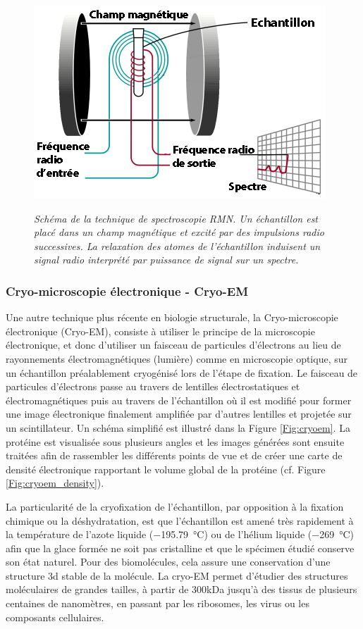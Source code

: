 \begin{figure}[h]
  \centering
  {\includegraphics[width=0.7\linewidth]{./figures/ch1/rmn.png}}
    \caption[Schéma de la technique de spectroscopie RMN.]{\it Schéma de la technique de spectroscopie RMN. Un échantillon est placé dans un champ magnétique et excité par des impulsions radio successives. La relaxation des atomes de l'échantillon induisent un signal radio interprété par puissance de signal sur un spectre.}
    \label{Fig:rmn}
  \hspace{0.2cm}
\end{figure}

\subsubsection{Cryo-microscopie électronique - Cryo-EM}


Une autre technique plus récente en biologie structurale, la Cryo-microscopie électronique (Cryo-EM), consiste à utiliser le principe de la microscopie électronique, et donc d'utiliser un faisceau de particules d'électrons au lieu de rayonnements électromagnétiques (lumière) comme en microscopie optique, sur un échantillon préalablement cryogénisé lors de l'étape de fixation. Le faisceau de particules d'électrons passe au travers de lentilles électrostatiques et électromagnétiques puis au travers de l'échantillon où il est modifié pour former une image électronique finalement amplifiée par d'autres lentilles et projetée sur un scintillateur. Un schéma simplifié est illustré dans la Figure \ref{Fig:cryoem}.
La protéine est visualisée sous plusieurs angles et les images générées sont ensuite traitées afin de rassembler les différents points de vue et de créer une carte de densité électronique rapportant le volume global de la protéine (cf. Figure \ref{Fig:cryoem_density}).

La particularité de la cryofixation de l'échantillon, par opposition à la fixation chimique ou la déshydratation, est que l'échantillon est amené très rapidement à la température de l'azote liquide (\SI{-195.79}{\degreeCelsius}) ou de l'hélium liquide (\SI{-269}{\degreeCelsius}) afin que la glace formée ne soit pas cristalline et que le spécimen étudié conserve son état naturel. Pour des biomolécules, cela assure une conservation d'une structure 3d stable de la molécule. La cryo-EM permet d'étudier des structures moléculaires de grandes tailles, à partir de 300kDa jusqu'à des tissus de plusieurs centaines de nanomètres, en passant par les ribosomes, les virus ou les composants cellulaires.

